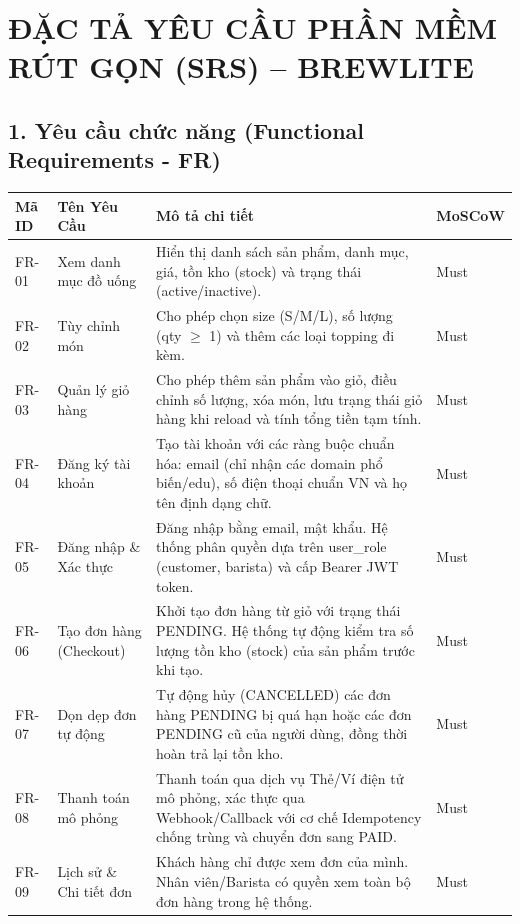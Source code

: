 \documentclass[11pt,a4paper]{article}
\author{Nhóm BrewLite}
\date{}
\begin{document}
\section*{ĐẶC TẢ YÊU CẦU PHẦN MỀM RÚT GỌN (SRS) -- BREWLITE}

\subsection*{1. Yêu cầu chức năng (Functional Requirements - FR)}
\label{sec:functional-requirements}

\begin{longtable}[]{@{}
  >{\raggedright\arraybackslash}p{}
  >{\raggedright\arraybackslash}p{}
  >{\raggedright\arraybackslash}p{}
  >{\raggedright\arraybackslash}p{}@{}}
\toprule
\textbf{Mã ID} & \textbf{Tên Yêu Cầu} & \textbf{Mô tả chi tiết} & \textbf{MoSCoW} \\
\midrule
\endhead
\bottomrule
\endlastfoot
FR-01 & Xem danh mục đồ uống & Hiển thị danh sách sản phẩm, danh mục, giá, tồn kho (stock) và trạng thái (active/inactive). & Must \\
FR-02 & Tùy chỉnh món & Cho phép chọn size (S/M/L), số lượng (qty $\ge$ 1) và thêm các loại topping đi kèm. & Must \\
FR-03 & Quản lý giỏ hàng & Cho phép thêm sản phẩm vào giỏ, điều chỉnh số lượng, xóa món, lưu trạng thái giỏ hàng khi reload và tính tổng tiền tạm tính. & Must \\
FR-04 & Đăng ký tài khoản & Tạo tài khoản với các ràng buộc chuẩn hóa: email (chỉ nhận các domain phổ biến/edu), số điện thoại chuẩn VN và họ tên định dạng chữ. & Must \\
FR-05 & Đăng nhập \& Xác thực & Đăng nhập bằng email, mật khẩu. Hệ thống phân quyền dựa trên user\_role (customer, barista) và cấp Bearer JWT token. & Must \\
FR-06 & Tạo đơn hàng (Checkout) & Khởi tạo đơn hàng từ giỏ với trạng thái PENDING. Hệ thống tự động kiểm tra số lượng tồn kho (stock) của sản phẩm trước khi tạo. & Must \\
FR-07 & Dọn dẹp đơn tự động & Tự động hủy (CANCELLED) các đơn hàng PENDING bị quá hạn hoặc các đơn PENDING cũ của người dùng, đồng thời hoàn trả lại tồn kho. & Must \\
FR-08 & Thanh toán mô phỏng & Thanh toán qua dịch vụ Thẻ/Ví điện tử mô phỏng, xác thực qua Webhook/Callback với cơ chế Idempotency chống trùng và chuyển đơn sang PAID. & Must \\
FR-09 & Lịch sử \& Chi tiết đơn & Khách hàng chỉ được xem đơn của mình. Nhân viên/Barista có quyền xem toàn bộ đơn hàng trong hệ thống. & Must \\

\end{longtable}
\end{document}
